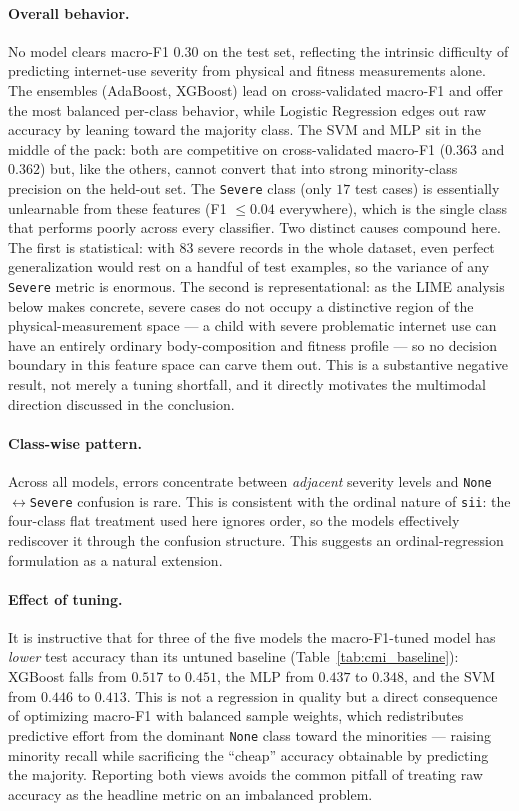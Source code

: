 \paragraph{Overall behavior.} No model clears macro-F1 $0.30$ on the test set, reflecting the intrinsic difficulty of predicting internet-use severity from physical and fitness measurements alone. The ensembles (AdaBoost, XGBoost) lead on cross-validated macro-F1 and offer the most balanced per-class behavior, while Logistic Regression edges out raw accuracy by leaning toward the majority class. The SVM and MLP sit in the middle of the pack: both are competitive on cross-validated macro-F1 ($0.363$ and $0.362$) but, like the others, cannot convert that into strong minority-class precision on the held-out set. The \texttt{Severe} class (only $17$ test cases) is essentially unlearnable from these features (F1 $\leq 0.04$ everywhere), which is the single class that performs poorly across every classifier. Two distinct causes compound here. The first is statistical: with $83$ severe records in the whole dataset, even perfect generalization would rest on a handful of test examples, so the variance of any \texttt{Severe} metric is enormous. The second is representational: as the LIME analysis below makes concrete, severe cases do not occupy a distinctive region of the physical-measurement space --- a child with severe problematic internet use can have an entirely ordinary body-composition and fitness profile --- so no decision boundary in this feature space can carve them out. This is a substantive negative result, not merely a tuning shortfall, and it directly motivates the multimodal direction discussed in the conclusion.

\paragraph{Class-wise pattern.} Across all models, errors concentrate between \emph{adjacent} severity levels and \texttt{None}$\leftrightarrow$\texttt{Severe} confusion is rare. This is consistent with the ordinal nature of \texttt{sii}: the four-class flat treatment used here ignores order, so the models effectively rediscover it through the confusion structure. This suggests an ordinal-regression formulation as a natural extension.

\paragraph{Effect of tuning.} It is instructive that for three of the five models the macro-F1-tuned model has \emph{lower} test accuracy than its untuned baseline (Table~\ref{tab:cmi_baseline}): XGBoost falls from $0.517$ to $0.451$, the MLP from $0.437$ to $0.348$, and the SVM from $0.446$ to $0.413$. This is not a regression in quality but a direct consequence of optimizing macro-F1 with balanced sample weights, which redistributes predictive effort from the dominant \texttt{None} class toward the minorities --- raising minority recall while sacrificing the ``cheap'' accuracy obtainable by predicting the majority. Reporting both views avoids the common pitfall of treating raw accuracy as the headline metric on an imbalanced problem.

